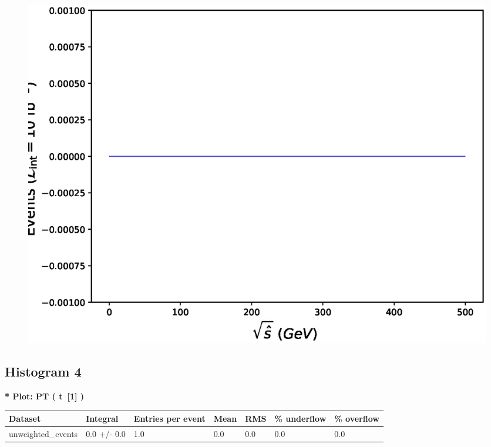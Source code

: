 \documentclass[a4paper, 10pt]{article}
\begin{document}
\begin{figure}[H]
  \begin{center}
    \includegraphics[scale=0.45]{selection_2.eps}\\
\caption{   }
  \end{center}
\end{figure}
      \newpage
\subsection{ Histogram 4}

\textbf{* Plot: PT ( t~[1] ) }\\
   \begin{table}[H]
  \begin{center}
    \begin{tabular}{|m{23.0mm}|m{23.0mm}|m{18.0mm}|m{19.0mm}|m{19.0mm}|m{19.0mm}|m{19.0mm}|}
      \hline
      {\cellcolor{yellow}         Dataset}& {\cellcolor{yellow}         Integral}& {\cellcolor{yellow}         Entries per event}& {\cellcolor{yellow}         Mean}& {\cellcolor{yellow}         RMS}& {\cellcolor{yellow}         \% underflow}& {\cellcolor{yellow}         \% overflow}\\
      \hline
      {\cellcolor{white}         unweighted\_events}& {\cellcolor{white}         0.0 +/\-- 0.0}& {\cellcolor{white}         1.0}& {\cellcolor{white}         0.0}& {\cellcolor{white}         0.0}& {\cellcolor{green}         0.0}& {\cellcolor{green}         0.0}\\
\hline
    \end{tabular}
  \end{center}
\end{table}
\end{document}
